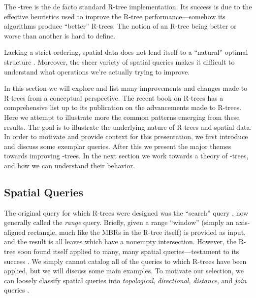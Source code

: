 \newcommand{\keyword}[1]{\textbf{#1}}


The \rstar-tree is the de facto standard R-tree implementation.
Its success is due to the effective heuristics used to improve the R-tree performance---somehow its algorithms produce ``better'' R-trees.
The notion of an R-tree being better or worse than another is hard to define.

Lacking a strict ordering, spatial data does not lend itself to a ``natural'' optimal structure \cite{gaedegunther98}.
Moreover, the sheer variety of spatial queries makes it difficult to understand what operations we're actually trying to improve.

In this section we will explore and list many improvements and changes made to R-trees from a conceptual perspective.
The recent book on R-trees \cite{thebook} has a comprehensive list up to its publication on the advancements made to R-trees.
Here we attempt to illustrate more the common patterns emerging from these results.
The goal is to illustrate the underlying nature of R-trees and spatial data.
In order to motivate and provide context for this presentation, we first introduce and discuss some exemplar queries.
After this we present the major themes towards improving \rbase-trees.
In the next section we work towards a theory of \rbase-trees, and how we can understand their behavior.

\subsection{Spatial Queries}
The original query for which R-trees were designed was the ``search'' query \cite{guttman84}, now generally called the \emph{range} query.
Briefly, given a range ``window'' (simply an axis-aligned rectangle, much like the MBRs in the R-tree itself) is provided as input, and the result is all leaves which have a nonempty intersection.
However, the R-tree soon found itself applied to many, many spatial queries---testament to its success \cite{something}.
We simply cannot catalog all of the queries to which R-trees have been applied, but we will discuss some main examples.
To motivate our selection, we can loosely classify spatial queries into \emph{topological}, \emph{directional}, \emph{distance}, and \emph{join} queries \cite{thebook,manolopoulos2003r}.

